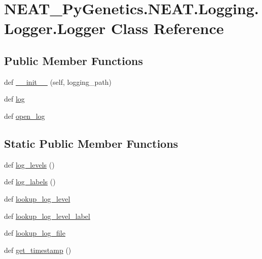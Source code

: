 \hypertarget{classNEAT__PyGenetics_1_1NEAT_1_1Logging_1_1Logger_1_1Logger}{}\section{N\+E\+A\+T\+\_\+\+Py\+Genetics.\+N\+E\+A\+T.\+Logging.\+Logger.\+Logger Class Reference}
\label{classNEAT__PyGenetics_1_1NEAT_1_1Logging_1_1Logger_1_1Logger}
\subsection*{Public Member Functions}
\begin{DoxyCompactItemize}
\item 
def \hyperlink{classNEAT__PyGenetics_1_1NEAT_1_1Logging_1_1Logger_1_1Logger_a858ce7abb17975fcefb7f106aa4413fa}{\+\_\+\+\_\+init\+\_\+\+\_\+} (self, logging\+\_\+path)
\item 
def \hyperlink{classNEAT__PyGenetics_1_1NEAT_1_1Logging_1_1Logger_1_1Logger_acaf6c6a388e2aeceb191e6416431ef97}{log}
\item 
def \hyperlink{classNEAT__PyGenetics_1_1NEAT_1_1Logging_1_1Logger_1_1Logger_a4fd31c2e55ff5ec5710a96a86515f825}{open\+\_\+log}
\end{DoxyCompactItemize}
\subsection*{Static Public Member Functions}
\begin{DoxyCompactItemize}
\item 
def \hyperlink{classNEAT__PyGenetics_1_1NEAT_1_1Logging_1_1Logger_1_1Logger_abefae8d696e558dbcfe6d462ba412568}{log\+\_\+levels} ()
\item 
def \hyperlink{classNEAT__PyGenetics_1_1NEAT_1_1Logging_1_1Logger_1_1Logger_a1078ad3713a23a85878a39da7450f208}{log\+\_\+labels} ()
\item 
def \hyperlink{classNEAT__PyGenetics_1_1NEAT_1_1Logging_1_1Logger_1_1Logger_a6b33597baed0f2c1efdb4a1d92043512}{lookup\+\_\+log\+\_\+level}
\item 
def \hyperlink{classNEAT__PyGenetics_1_1NEAT_1_1Logging_1_1Logger_1_1Logger_aea6ef2ac230f8c205a06ee2f3ad026e3}{lookup\+\_\+log\+\_\+level\+\_\+label}
\item 
def \hyperlink{classNEAT__PyGenetics_1_1NEAT_1_1Logging_1_1Logger_1_1Logger_a6bdf29e33cd10e29df28e684ad55ac67}{lookup\+\_\+log\+\_\+file}
\item 
def \hyperlink{classNEAT__PyGenetics_1_1NEAT_1_1Logging_1_1Logger_1_1Logger_acb0c25d04b6f862dc358783264e29d66}{get\+\_\+timestamp} ()
\end{DoxyCompactItemize}


